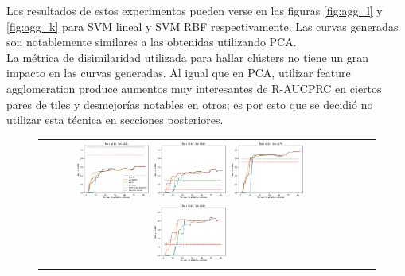 Los resultados de estos experimentos pueden verse en las figuras \ref{fig:agg_l} y \ref{fig:agg_k} para SVM lineal y SVM RBF respectivamente. Las curvas generadas son notablemente similares a las obtenidas utilizando PCA. \\

La métrica de disimilaridad utilizada para hallar clústers no tiene un gran impacto en las curvas generadas. Al igual que en PCA, utilizar feature agglomeration produce aumentos muy interesantes de R-AUCPRC en ciertos pares de tiles y desmejorías notables en otros; es por esto que se decidió no utilizar esta técnica en secciones posteriores.

\begin{figure}[h!]
\begin{tabular}{cccc}
  \includegraphics[width=0.25\textwidth]{Kap5/linear_ALL_LINKAGES_train=b234test=b261.png}  
  \includegraphics[width=0.25\textwidth]{Kap5/linear_ALL_LINKAGES_train=b234test=b360.png}
  \includegraphics[width=0.25\textwidth]{Kap5/linear_ALL_LINKAGES_train=b261test=b278.png}  
  \includegraphics[width=0.25\textwidth]{Kap5/linear_ALL_LINKAGES_train=b261test=b360.png} \\


\end{tabular}
\end{figure}
